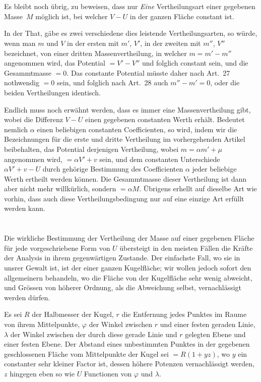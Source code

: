\documentclass[12pt,a4paper]{article}
\begin{document}
\section{}
Es bleibt noch übrig, zu beweisen, dass nur \emph{Eine} Vertheilungsart einer
gegebenen Masse~$M$ möglich ist, bei welcher $V-U$ in der ganzen Fläche constant ist.

In der That, gäbe es zwei verschiedene dies leistende Vertheilungsarten,
so würde, wenn man $m$ und $V$ in der ersten mit $m'$, $V'$, in der zweiten mit $m''$,
$V''$ bezeichnet, von einer dritten Massenvertheilung, in welcher $m=m'-m''$
angenommen wird, das Potential $=V'-V''$ und folglich constant sein, und die
Gesammtmasse $=0$. Das constante Potential müsste daher nach Art.~27 nothwendig $=0$ sein, und folglich nach Art.~28 auch $m''-m'=0$, oder die beiden Vertheilungen identisch.

Endlich muss noch erwähnt werden, dass es immer eine Massenvertheilung
gibt, wobei die Differenz $V-U$ einen gegebenen constanten Werth erhält.
Bedeutet nemlich $\alpha$ einen beliebigen constanten Coefficienten, so wird, indem wir
die Bezeichnungen für die erste und dritte Vertheilung im vorhergehenden Artikel
beibehalten, das Potential derjenigen Vertheilung, wobei $m=\alpha m'+\mu$ angenommen
wird, $=\alpha V'+v$ sein, und dem constanten Unterschiede $\alpha V'+v-U$
durch gehörige Bestimmung des Coefficienten $\alpha$ jeder beliebige Werth ertheilt
werden können. Die Gesammtmasse dieser Vertheilung ist dann aber nicht mehr
willkürlich, sondern $=\alpha M$. Übrigens erhellt auf dieselbe Art wie vorhin,
dass auch diese Vertheilungsbedingung nur auf eine einzige Art erfüllt werden kann.

\section{}
Die wirkliche Bestimmung der Vertheilung der Masse auf einer gegebenen
Fläche für jede vorgeschriebene Form von $U$ übersteigt in den meisten Fällen
die Kräfte der Analysis in ihrem gegenwärtigen Zustande. Der einfachste Fall,
wo sie in unsrer Gewalt ist, ist der einer ganzen Kugelfläche; wir wollen jedoch
sofort den allgemeinern behandeln, wo die Fläche von der Kugelfläche sehr wenig
abweicht, und Grössen von höherer Ordnung, als die Abweichung selbst,
vernachlässigt werden dürfen.

Es sei $R$ der Halbmesser der Kugel, $r$ die Entfernung jedes Punktes im
Raume von ihrem Mittelpunkte, $\varphi$ der Winkel zwischen $r$ und einer festen geraden
Linie, $\lambda$ der Winkel zwischen der durch diese gerade Linie und $r$ gelegten Ebene
und einer festen Ebene. Der Abstand eines unbestimmten Punktes in der gegebenen geschlossenen Fläche vom Mittelpunkte der Kugel sei $=R(1+yz)$, wo $y$ ein constanter sehr kleiner Factor ist, dessen höhere Potenzen vernachlässigt werden, $z$ hingegen eben so wie $U$ Functionen von $\varphi$ und $\lambda$.
\end{document}
